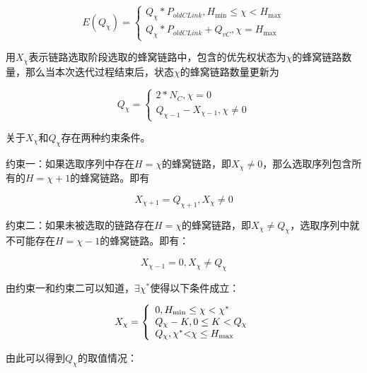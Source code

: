 \documentclass[figurelist,tablelist,algorithmlist,nomlist,masters]{seuthesix}
\begin{document}
	\begin{equation}\label{eq3.1}
	E(Q_{\chi }) = \left\{ \begin{array}{l}
	Q_{\chi }*{P_{oldCLink}},{H_{\min }} \le \chi  < {H_{\max }}\\
	Q_{\chi }*{P_{oldCLink}} + Q_{vC},{\chi } = {H_{\max }}
	\end{array} \right.
	\end{equation}
	
	用$X_{\chi }$表示链路选取阶段选取的蜂窝链路中，包含的优先权状态为$\chi $的蜂窝链路数量，那么当本次迭代过程结束后，状态$\chi $的蜂窝链路数量更新为
	
	\begin{equation}\label{eq3.1}
	Q_\chi  = \left\{ \begin{array}{l}
	2*N_C,\chi  = 0\\
	Q_{\chi  - 1} - X_{\chi - 1},\chi \ne 0
	\end{array} \right.
	\end{equation}
	
	关于$X_{\chi }$和$Q_{\chi }$存在两种约束条件。
	
	约束一：如果选取序列中存在$H = \chi $的蜂窝链路，即$X_\chi \ne 0$，那么选取序列包含所有的$H = \chi + 1$的蜂窝链路。即有
	
	\begin{equation}\label{eq3.1}
	X_{\chi  + 1} = Q_{\chi  + 1},X_\chi \ne 0
	\end{equation}
	
	
	约束二：如果未被选取的链路存在$H = \chi $的蜂窝链路，即$X_{\chi } \ne Q_{\chi }$，选取序列中就不可能存在$H = \chi - 1$的蜂窝链路。即有：
	
	\begin{equation}\label{eq3.1}
	X_{\chi  - 1} = 0,X_{\chi } \ne Q_{\chi }
	\end{equation}
	
	由约束一和约束二可以知道，$\exists \chi ^*$使得以下条件成立：
	
	
	\begin{equation}\label{eq3.1}
	{X_\chi } = \left\{ \begin{array}{l}
	0,{H_{\min }} \le \chi  < {\chi ^*}\\
	{Q_\chi } - K,0 \le K < {Q_\chi }\\
	{Q_\chi },{\chi ^*}{\rm{ <  }}\chi  \le {H_{\max }}
	\end{array} \right.
	\end{equation}
	
	由此可以得到$Q_{\chi}$的取值情况：
	
\end{document}
